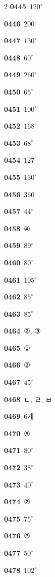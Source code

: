\documentclass[10pt,a4paper]{article}
\begin{document}
\begin{multicols}{2}
\noindent\textbf{0445}\ $120^\circ$\par
\noindent\textbf{0446}\ $200^\circ$\par
\noindent\textbf{0447}\ $130^\circ$\par
\noindent\textbf{0448}\ $60^\circ$\par
\noindent\textbf{0449}\ $260^\circ$\par
\noindent\textbf{0450}\ $65^\circ$\par
\noindent\textbf{0451}\ $100^\circ$\par
\noindent\textbf{0452}\ $168^\circ$\par
\noindent\textbf{0453}\ $68^\circ$\par
\noindent\textbf{0454}\ $127^\circ$\par
\noindent\textbf{0455}\ $130^\circ$\par
\noindent\textbf{0456}\ $360^\circ$\par
\noindent\textbf{0457}\ $44^\circ$\par
\noindent\textbf{0458}\ ④\par
\noindent\textbf{0459}\ $89^\circ$\par
\noindent\textbf{0460}\ $80^\circ$\par
\noindent\textbf{0461}\ $105^\circ$\par
\noindent\textbf{0462}\ $85^\circ$\par
\noindent\textbf{0463}\ $85^\circ$\par
\noindent\textbf{0464}\ ②, ③\par
\noindent\textbf{0465}\ ①\par
\noindent\textbf{0466}\ ②\par
\noindent\textbf{0467}\ $45^\circ$\par
\noindent\textbf{0468}\ ㄴ, ㄹ, ㅂ\par
\noindent\textbf{0469}\ 6개\par
\noindent\textbf{0470}\ ⑤\par
\noindent\textbf{0471}\ $80^\circ$\par
\noindent\textbf{0472}\ $38^\circ$\par
\noindent\textbf{0473}\ $40^\circ$\par
\noindent\textbf{0474}\ ②\par
\noindent\textbf{0475}\ $75^\circ$\par
\noindent\textbf{0476}\ ③\par
\noindent\textbf{0477}\ $50^\circ$\par
\noindent\textbf{0478}\ $102^\circ$\par

\end{multicols}
\end{document}
